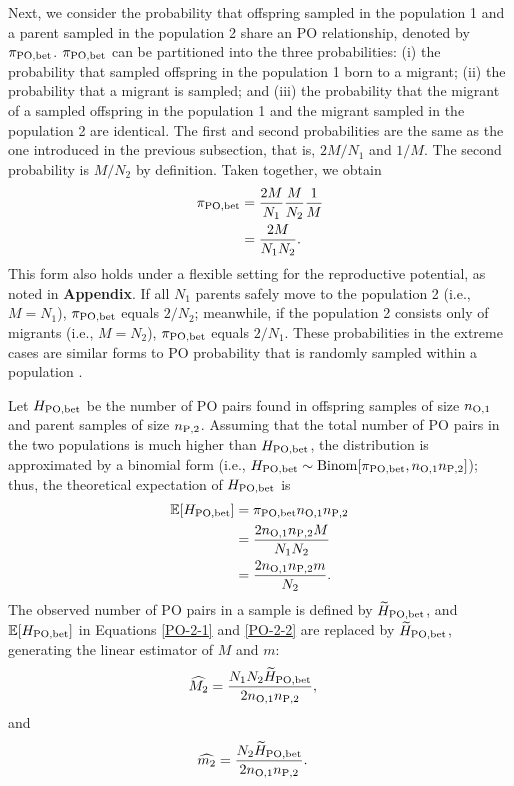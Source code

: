 \documentclass[12pt, English]{article}
\begin{document}
\begin{spacing}{1.9}
Next, we consider the probability that offspring sampled in the population 1 and a parent sampled in the population 2 share an PO relationship, denoted by $\pi_{\rm PO, bet}$. $\pi_{\rm PO, bet}$ can be partitioned into the three probabilities: (i) the probability that sampled offspring in the population 1 born to a migrant; (ii) the probability that a migrant is sampled; and (iii) the probability that the migrant of a sampled offspring in the population 1 and the migrant sampled in the population 2 are identical. The first and second probabilities are the same as the one introduced in the previous subsection, that is, $2M/N_{1}$ and $1/M$. The second probability is $M/N_{2}$ by definition. Taken together, we obtain
\begin{align}
\pi_{\rm PO,bet} &= \frac{2M}{N_{1}} \frac{M}{N_{2}} \frac{1}{M} \nonumber\\
&= \frac{2M}{N_{1}N_{2}}.
\label{PO-1}
\end{align}
This form also holds under a flexible setting for the reproductive potential, as noted in {\bf Appendix}. If all $N_1$ parents safely move to the population 2 (i.e., $M = N_1$), $\pi_{\rm PO,bet}$ equals $2/N_2$; meanwhile, if the population 2 consists only of migrants (i.e., $M = N_2$), $\pi_{\rm PO,bet}$ equals $2/N_1$. These probabilities in the extreme cases are similar forms to PO probability that is randomly sampled within a population \cite[]{bravington2016close}. 

Let $H_{\rm PO,bet}$ be the number of PO pairs found in offspring samples of size $n_{\rm O, 1}$ and parent samples of size $n_{\rm P, 2}$. Assuming that the total number of PO pairs in the two populations is much higher than $H_{\rm PO,bet}$, the distribution is approximated by a binomial form (i.e., $H_{\rm PO,bet} \sim {\rm Binom}[\pi_{\rm PO,bet}, n_{\rm O, 1} n_{\rm P, 2}]$); thus, the theoretical expectation of $H_{\rm PO,bet}$ is
\begin{align}
\mathbb{E}[H_{\rm PO, bet}] &= \pi_{\rm PO,bet} n_{\rm O, 1} n_{\rm P, 2} \nonumber\\
&= \frac{ 2 n_{\rm O, 1} n_{\rm P, 2} M } { N_{1} N_{2} } \label{PO-2-1} \\
&= \frac{ 2 n_{\rm O, 1} n_{\rm P, 2} m } { N_{2} }.
\label{PO-2-2}
\end{align}
The observed number of PO pairs in a sample is defined by $\widetilde{H}_{\rm PO, bet}$, and $\mathbb{E}[H_{\rm PO, bet}]$ in Equations \ref{PO-2-1} and \ref{PO-2-2} are replaced by $\widetilde{H}_{\rm PO, bet}$, generating the linear estimator of $M$ and $m$:
\begin{align}
\widehat{M_2} &= \frac{N_{1} N_{2} \widetilde{H}_{\rm PO,bet} } {2 n_{\rm O, 1} n_{\rm P, 2} },
\label{PO-3}
\end{align}
and
\begin{align}
\widehat{m_2} &= \frac{N_{2} \widetilde{H}_{\rm PO,bet} } {2 n_{\rm O, 1} n_{\rm P, 2} }.
\label{PO-4}
\end{align}


\end{spacing}
\end{document}
